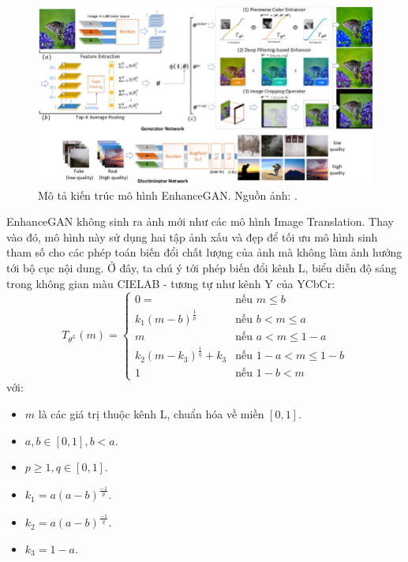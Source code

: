 \documentclass[12pt]{extreport}
\begin{document}
\begin{figure}[H]
    \centering
    \includegraphics[width=.9\linewidth]{figure44.png}
    \caption{Mô tả kiến trúc mô hình EnhanceGAN. Nguồn ảnh: \cite{DBLP:journals/corr/DengLT17}.}
\end{figure}

EnhanceGAN không sinh ra ảnh mới như các mô hình Image Translation. Thay vào đó, mô hình này sử dụng hai tập ảnh xấu và đẹp để tối ưu mô hình sinh tham số cho các phép toán biến đổi chất lượng của ảnh mà không làm ảnh hưởng tới bộ cục nội dung. Ở đây, ta chú ý tới phép biến đổi kênh L, biểu diễn độ sáng trong không gian màu CIELAB - tương tự như kênh Y của YCbCr:
$$
    T_{\theta^L}(m) = \begin{cases}
        0 =                               & \text{nếu } m \leq b             \\
        k_1 (m - b)^{\frac{1}{p}}         & \text{nếu } b < m \leq a         \\
        m                                 & \text{nếu } a < m \leq 1 - a     \\
        k_2 (m - k_3)^{\frac{1}{q}} + k_3 & \text{nếu } 1 - a < m \leq 1 - b \\
        1                                 & \text{nếu } 1 - b < m
    \end{cases}
$$
với:
\begin{itemize}
    \item $ m $ là các giá trị thuộc kênh L, chuẩn hóa về miền $ [0, 1] $.
    \item $ a, b \in [0, 1], b < a $.
    \item $ p \geq 1, q \in [0, 1] $.
    \item $ k_1 = a(a - b)^{\frac{-1}{p}} $.
    \item $ k_2 = a(a - b)^{\frac{-1}{q}} $.
    \item $ k_3 = 1 - a $.
\end{itemize}
\end{document}
